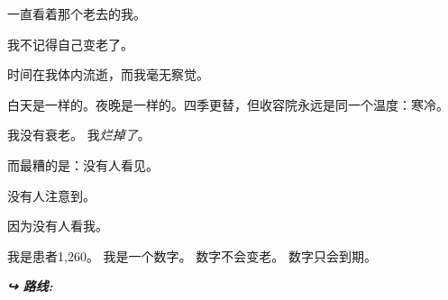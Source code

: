 \noindent 一直看着那个老去的我。

\noindent 我不记得自己变老了。

\noindent 时间在我体内流逝，而我毫无察觉。

\noindent 白天是一样的。夜晚是一样的。四季更替，但收容院永远是同一个温度：寒冷。

\noindent 我没有衰老。
我\textit{烂掉了}。

\noindent 而最糟的是：没有人看见。

\noindent 没有人注意到。

\noindent 因为没有人看我。

\noindent 我是患者1,260。
我是一个数字。
数字不会变老。
数字只会到期。

\vspace{0.5em}
\noindent\textit{\textbf{↪ 路线:}  \rotasep {}}
